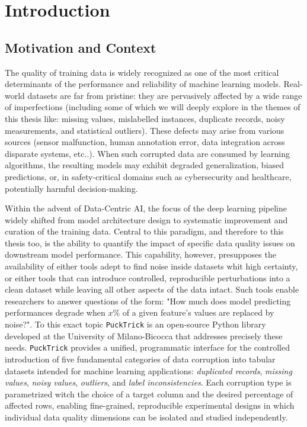 \documentclass[../main.tex]{subfiles}
\begin{document}
\chapter{Introduction}
\label{chap:intro}

\vspace*{-2em}
\section{Motivation and Context}
\label{sec:motivation}

The quality of training data is widely recognized as one of the most critical determinants of the performance and reliability of machine learning models. Real-world datasets are far from pristine: they are pervasively affected by a wide range of imperfections (including some of which we will deeply explore in the themes of this thesis like: missing values, mislabelled instances, duplicate records, noisy measurements, and statistical outliers).  These defects may arise from various sources (sensor malfunction, human annotation error, data integration across disparate systems, etc..).  When such corrupted data are consumed by learning algorithms, the resulting models may exhibit degraded generalization, biased predictions, or, in safety-critical domains such as cybersecurity and healthcare, potentially harmful decision-making. 

Within the advent of Data-Centric AI, the focus of the deep learning pipeline widely shifted from model architecture design to systematic improvement and curation of the training data.  Central to this paradigm, and therefore to this thesis too, is the ability to quantify the impact of specific data quality issues on downstream model performance.  This capability, however, presupposes the availability of either tools adept to find noise inside datasets whit high certainty, or either tools that can introduce controlled, reproducible perturbations into a clean dataset while leaving all other aspects of the data intact.
Such tools enable researchers to answer questions of the form: "How much does model predicting performances degrade when $x$\% of a given feature's values are replaced by noise?". To this exact topic \texttt{PuckTrick}\supercite{pucktrick_docs} is an open-source Python library developed at the University of Milano-Bicocca that addresses precisely these needs. \texttt{PuckTrick} provides a unified, programmatic interface for the controlled introduction of five fundamental categories of data corruption into tabular datasets intended for machine learning applications: \emph{duplicated records}, \emph{missing values}, \emph{noisy values}, \emph{outliers}, and \emph{label inconsistencies}.  Each corruption type is parametrized witch the choice of a target column and the desired percentage of affected rows, enabling fine-grained, reproducible experimental designs in which individual data quality dimensions can be isolated and studied independently.
\end{document}
